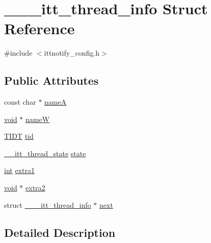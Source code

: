 \hypertarget{struct______itt__thread__info}{\section{\-\_\-\-\_\-\-\_\-itt\-\_\-thread\-\_\-info Struct Reference}
\label{struct______itt__thread__info}
}


{\ttfamily \#include $<$ittnotify\-\_\-config.\-h$>$}

\subsection*{Public Attributes}
\begin{DoxyCompactItemize}
\item 
const char $\ast$ \hyperlink{struct______itt__thread__info_af0d071b9ab2b86c040a6de800f92cb30}{name\-A}
\item 
\hyperlink{ittnotify__static_8h_af941d56e55e3c5465135b60c4d6343ed}{void} $\ast$ \hyperlink{struct______itt__thread__info_a607067bccd38bfb17c9f7c8676caf03d}{name\-W}
\item 
\hyperlink{ittnotify__config_8h_a29a5bb118e7357976d9168d5cccfb0ce}{T\-I\-D\-T} \hyperlink{struct______itt__thread__info_adfe992c44e507418c56b509c9c985393}{tid}
\item 
\hyperlink{ittnotify__config_8h_a0f5df24d0c9150a5b08d6d701060ba27}{\-\_\-\-\_\-itt\-\_\-thread\-\_\-state} \hyperlink{struct______itt__thread__info_a6f6f3ed5a462461cc8dc05b650e331ba}{state}
\item 
\hyperlink{ittnotify__static_8h_a8b8dcd723308a8cb5d84277c7a3fff70}{int} \hyperlink{struct______itt__thread__info_a24093b12fcbe313abcf61c449d42d66c}{extra1}
\item 
\hyperlink{ittnotify__static_8h_af941d56e55e3c5465135b60c4d6343ed}{void} $\ast$ \hyperlink{struct______itt__thread__info_a29a043e53a66cc89b62b11f0ad8e7588}{extra2}
\item 
struct \hyperlink{struct______itt__thread__info}{\-\_\-\-\_\-\-\_\-itt\-\_\-thread\-\_\-info} $\ast$ \hyperlink{struct______itt__thread__info_a1c1665afb537536190a66931a94ccae8}{next}
\end{DoxyCompactItemize}


\subsection{Detailed Description}


